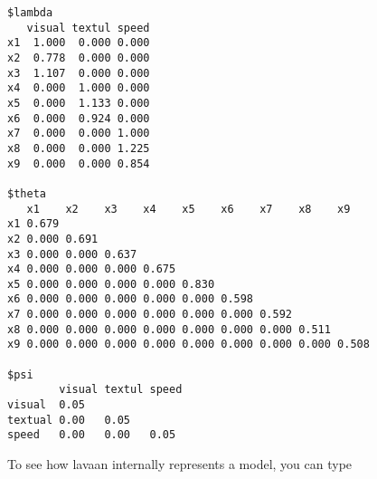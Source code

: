 \begin{verbatim}
$lambda
   visual textul speed
x1  1.000  0.000 0.000
x2  0.778  0.000 0.000
x3  1.107  0.000 0.000
x4  0.000  1.000 0.000
x5  0.000  1.133 0.000
x6  0.000  0.924 0.000
x7  0.000  0.000 1.000
x8  0.000  0.000 1.225
x9  0.000  0.000 0.854

$theta
   x1    x2    x3    x4    x5    x6    x7    x8    x9   
x1 0.679                                                
x2 0.000 0.691                                          
x3 0.000 0.000 0.637                                    
x4 0.000 0.000 0.000 0.675                              
x5 0.000 0.000 0.000 0.000 0.830                        
x6 0.000 0.000 0.000 0.000 0.000 0.598                  
x7 0.000 0.000 0.000 0.000 0.000 0.000 0.592            
x8 0.000 0.000 0.000 0.000 0.000 0.000 0.000 0.511      
x9 0.000 0.000 0.000 0.000 0.000 0.000 0.000 0.000 0.508

$psi
        visual textul speed
visual  0.05               
textual 0.00   0.05        
speed   0.00   0.00   0.05 
\end{verbatim}

To see how lavaan internally represents a model, you can type

\begin{Shaded}
\begin{Highlighting}[]
 \NormalTok{)}
\end{Highlighting}
\end{Shaded}

